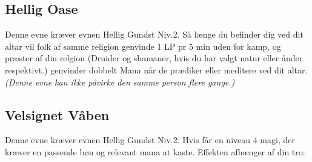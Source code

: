 \subsection{Hellig Oase}
Denne evne kræver evnen Hellig Gundst Niv.2. Så længe du befinder dig ved dit altar vil folk af samme religion genvinde 1 LP pr 5 min uden for kamp, og præster af din relgion (Druider og shamaner, hvis du har valgt natur eller ånder respektivt.) genvinder dobbelt Mana når de prædiker eller meditere ved dit altar. \textit{(Denne evne kan ikke påvirke den samme person flere gange.)}

\subsection{Velsignet Våben}
Denne evne kræver evnen Hellig Gundst Niv.2. 
Hvis får en niveau 4 magi, der kræver en passende bøn og relevant mana at kaste. Effekten afhænger af din tro:
